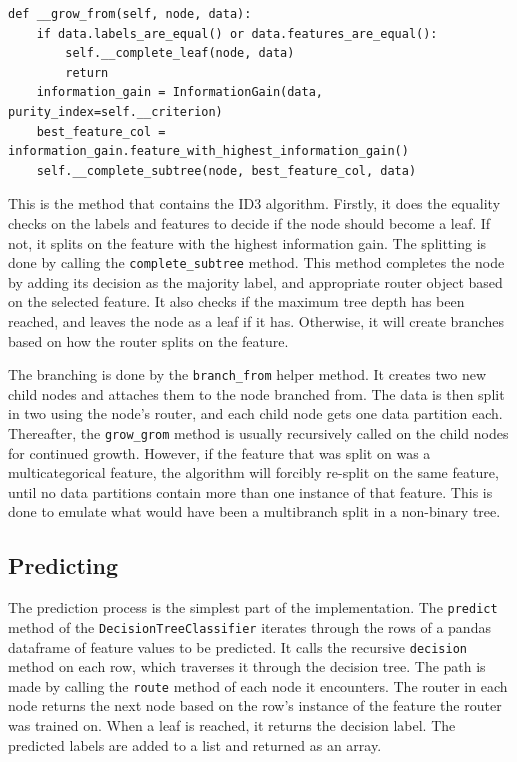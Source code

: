 \documentclass{article}
\begin{document}
\begin{verbatim}
def __grow_from(self, node, data):
    if data.labels_are_equal() or data.features_are_equal():
        self.__complete_leaf(node, data)
        return
    information_gain = InformationGain(data, purity_index=self.__criterion)
    best_feature_col = information_gain.feature_with_highest_information_gain()
    self.__complete_subtree(node, best_feature_col, data)
\end{verbatim}

This is the method that contains the ID3 algorithm.
Firstly, it does the equality checks on the labels and features to decide if the node should become a leaf.
If not, it splits on the feature with the highest information gain.
The splitting is done by calling the \texttt{complete\_subtree} method.
This method completes the node by adding its decision as the majority label, and appropriate router
object based on the selected feature. It also checks if the maximum tree depth has been
reached, and leaves the node as a leaf if it has.
Otherwise, it will create branches based on how the router splits on the feature.

The branching is done by the \texttt{branch\_from} helper method.
It creates two new child nodes and attaches them to the node branched from.
The data is then split in two using the node's router, and each child node
gets one data partition each.
Thereafter, the \texttt{grow\_grom} method is usually recursively called on the child nodes for continued growth. 
However, if the feature that was split on was a multicategorical feature, the algorithm
will forcibly re-split on the same feature, until no data partitions contain more than one instance of that feature.
This is done to emulate what would have been a multibranch split in a non-binary tree.

\subsection{Predicting}

The prediction process is the simplest part of the implementation.
The \texttt{predict} method of the \texttt{DecisionTreeClassifier} iterates through 
the rows of a pandas dataframe of feature values to be predicted.
It calls the recursive \texttt{decision} method on each row, which traverses it through the decision tree.
The path is made by calling the \texttt{route} method of each node it encounters.
The router in each node returns the next node based on the row's instance
of the feature the router was trained on.
When a leaf is reached, it returns the decision label.
The predicted labels are added to a list and returned as an array.
\end{document}
